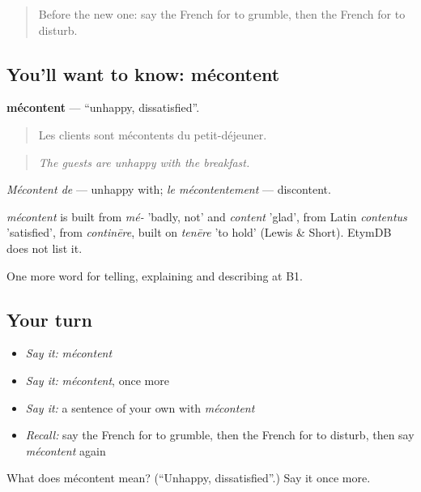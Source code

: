 \label{lesson:FR-C431-mecontent}



\begin{quote}
Before the new one: say the French for to grumble, then the French for to disturb.
\end{quote}

\subsection*{You'll want to know: mécontent}
\textbf{mécontent} — \textquotedblleft{}unhappy, dissatisfied\textquotedblright{}.

\begin{quote}
Les clients sont mécontents du petit-déjeuner.
\end{quote}

\begin{quote}
\emph{The guests are unhappy with the breakfast.}
\end{quote}

\emph{Mécontent de} — unhappy with; \emph{le mécontentement} — discontent.

\begin{cousinweb}
\emph{mécontent} is built from \emph{mé-} 'badly, not' and \emph{content} 'glad', from Latin \emph{contentus} 'satisfied', from \emph{continēre}, built on \emph{tenēre} 'to hold' (Lewis \& Short). EtymDB does not list it.
\end{cousinweb}

\begin{grammarlens}[title={What you've built}]
One more word for telling, explaining and describing at B1.
\end{grammarlens}

\subsection*{Your turn}
\begin{itemize}
\raggedright
  \item \emph{Say it:} \emph{mécontent}
  \item \emph{Say it:} \emph{mécontent}, once more
  \item \emph{Say it:} a sentence of your own with \emph{mécontent}
  \item \emph{Recall:} say the French for to grumble, then the French for to disturb, then say \emph{mécontent} again
\end{itemize}

\begin{tcolorbox}[breakable,colback=teal!4,colframe=teal!35!black,title={Before you move on}]
What does mécontent mean? (\textquotedblleft{}Unhappy, dissatisfied\textquotedblright{}.) Say it once more.
\end{tcolorbox}
